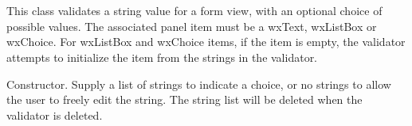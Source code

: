 \section{}\label{wxstringformvalidator}

This class validates a string value for a form view, with an optional choice of possible values.
The associated panel item must be a wxText, wxListBox or wxChoice. For wxListBox and wxChoice items,
if the item is empty, the validator attempts to initialize the item from the strings in
the validator.






Constructor. Supply a list of strings to indicate a choice, or no strings to allow the
user to freely edit the string. The string list will be deleted when the validator is deleted.

